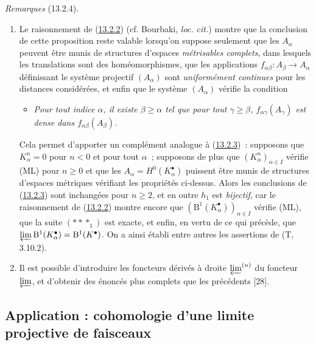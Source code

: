 \begin{env}[13.2.4]
\label{0.13.2.4-fr}
\emph{Remarques} (13.2.4).
\begin{enumerate}
\item[\emph{(i)}]
Le raisonnement de (\hyperref[0.13.2.2-fr]{13.2.2}) (cf. Bourbaki,
\emph{loc. cit.}) montre que la conclusion de cette proposition reste
valable lorsqu'on suppose seulement que les $A_\alpha$ peuvent être munis
de structures d'espaces \emph{métrisables complets}, dans lesquels les
translations sont des homéomorphismes, que les applications
$f_{\alpha\beta}:A_\beta\to A_\alpha$ définissant le système projectif
$(A_\alpha)$ sont \emph{uniformément continues} pour les distances
considérées, et enfin que le système $(A_\alpha)$ vérifie la condition
\begin{itemize}
\item[\textbf{(ML')}]
\emph{Pour tout indice $\alpha$, il existe $\beta\geq\alpha$ tel que pour
tout $\gamma\geq\beta$, $f_{\alpha\gamma}(A_\gamma)$ est dense dans
$f_{\alpha\beta}(A_\beta)$.}
\end{itemize}

Cela permet d'apporter un complément analogue à
(\hyperref[0.13.2.3-fr]{13.2.3})~: supposons que
$K_\alpha^n=0$ pour $n<0$ et pour tout $\alpha$~; supposons de plus que
$(K_\alpha^n)_{\alpha\in I}$ vérifie (ML) pour $n\geq0$ et que les
$A_\alpha=H^0(K_\alpha^\bullet)$ puissent être munis de structures
d'espaces métriques vérifiant les propriétés ci-dessus. Alors les
conclusions de (\hyperref[0.13.2.3-fr]{13.2.3}) sont inchangées pour
$n\geq2$, et en outre $h_1$ est \emph{bijectif}, car le raisonnement de
(\hyperref[0.13.2.2-fr]{13.2.2}) montre encore que
$(\mathrm B^1(K_\alpha^\bullet))_{\alpha\in I}$ vérifie (ML), que la suite
$(***_1)$ est exacte, et enfin, en vertu de ce qui précède, que
$\varprojlim\mathrm B^1(K_\alpha^\bullet)=\mathrm B^1(K^\bullet)$. On a
ainsi établi entre autres les assertions de (T, 3.10.2).

\item[\emph{(ii)}]
Il est possible d'introduire les foncteurs dérivés à droite
$\varprojlim^{(n)}$ du foncteur $\varprojlim$, et d'obtenir des énoncés
plus complets que les précédents [28].
\end{enumerate}
\end{env}

\subsection{Application : cohomologie d'une limite projective de faisceaux}
\label{subsection:0.13.3-fr}

